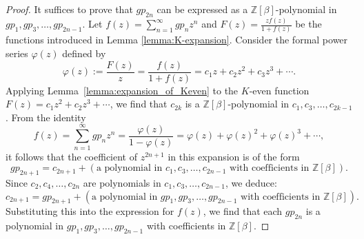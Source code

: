 \documentclass[dvipdfmx]{amsart}
\theoremstyle{definition}
\theoremstyle{remark}
\def\ZZ{\mathord{\mathbb{Z}}}
\begin{document}
\begin{proof}
It suffices to prove that \( gp_{2n} \) can be expressed as a \( \mathbb{Z}[\beta] \)-polynomial in \( gp_1, gp_3, \dots, gp_{2n-1} \).
Let \( f(z) = \sum_{n=1}^\infty gp_n z^n \) and \( F(z) = \frac{z f(z)}{1 + f(z)} \) be the functions introduced in Lemma \ref{lemma:K-expansion}.
Consider the formal power series $\varphi(z)$ defined by
\[
\varphi(z) := \frac{F(z)}{z} = \frac{f(z)}{1 + f(z)} = c_1 z + c_2 z^2 + c_3 z^3 + \cdots.
\]
Applying Lemma~\ref{lemma:expansion_of_Keven} to the $K$-even function $F(z)=c_1z^2+c_2z^3+\cdots$, we find that \( c_{2k} \) is a \( \mathbb{Z}[\beta] \)-polynomial in \( c_1, c_3, \dots, c_{2k-1} \).
From the identity
\begin{equation}\label{eq:phi_to_f}
f(z) = \sum_{n=1}^\infty gp_n z^n = \frac{\varphi(z)}{1 - \varphi(z)} 
= \varphi(z) + \varphi(z)^2 + \varphi(z)^3 + \cdots,
\end{equation}
it follows that the coefficient of \( z^{2n+1} \) in this expansion is of the form
\[
gp_{2n+1} = c_{2n+1} + 
(\text{a polynomial in } c_1,c_3,\dots,c_{2n-1}\text{ with coefficients in }\ZZ[\beta]).
\]
Since \( c_2, c_4, \dots, c_{2n} \) are polynomials in \( c_1, c_3, \dots, c_{2n-1} \), we deduce:
\[
c_{2n+1} = gp_{2n+1} + 
(\text{a polynomial in } gp_1,gp_3,\dots,gp_{2n-1}\text{ with coefficients in }\ZZ[\beta]).
\]
Substituting this into the expression for \( f(z) \), we find that each \( gp_{2n} \) is a polynomial in \( gp_1, gp_3, \dots, gp_{2n-1} \) with coefficients in \( \mathbb{Z}[\beta] \).
\end{proof}
\end{document}
